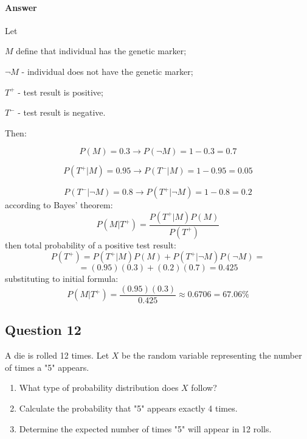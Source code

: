 \documentclass{article}
\begin{document}
\paragraph{Answer}
Let 

$M$ define that individual has the genetic marker;

$\neg M$ - individual does not have the genetic marker;

$T^+$ - test result is positive;

$T^-$ - test result is negative.

Then:

$$P(M) = 0.3 \rightarrow P(\neg M) = 1-0.3 = 0.7$$

$$P(T^+|M) = 0.95 \rightarrow P(T^-|M) = 1 - 0.95 = 0.05$$

$$P(T^-|\neg M)=0.8 \rightarrow P(T^+|\neg M) = 1-0.8=0.2 $$
according to Bayes' theorem:
$$P(M|T^+)=\frac{P(T^+|M)P(M)}{P(T^+)}$$
then total probability of a positive test result:
$$P(T^+)=P(T^+|M)P(M)+P(T^+|\neg M)P(\neg M)=$$
$$=(0.95)(0.3)+(0.2)(0.7)=0.425$$
substituting to initial formula:
$$P(M|T^+)=\frac{(0.95)(0.3)}{0.425}\approx 0.6706 = 67.06\%$$

\subsection{Question 12}
A die is rolled 12 times. Let $ X $ be the random variable representing the number of times a "5" appears.
\begin{enumerate}
    \item What type of probability distribution does $ X $ follow?
    \item Calculate the probability that "5" appears exactly 4 times.
    \item Determine the expected number of times "5" will appear in 12 rolls.
\end{enumerate}
\end{document}
